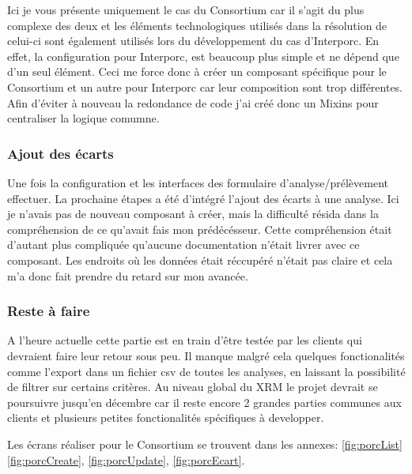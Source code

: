Ici je vous présente uniquement le cas du Consortium car il s'agit du plus complexe des deux et les éléments technologiques utilisés dans la résolution de celui-ci sont également utilisés lors du développement du cas d'Interporc. En effet, la configuration pour Interporc, est beaucoup plus simple et ne dépend que d'un seul élément. Ceci me force donc à créer un composant spécifique pour le Consortium et un autre pour Interporc car leur composition sont trop différentes. Afin d'éviter à nouveau la redondance de code j'ai créé donc un Mixins pour centraliser la logique comumne. 

\subsubsection{Ajout des écarts}
Une fois la configuration et les interfaces des formulaire d'analyse/prélèvement effectuer.
La prochaine étapes a été d'intégré l'ajout des écarts à une analyse. Ici je n'avais pas de nouveau composant à créer, mais la difficulté résida dans la compréhension de ce qu'avait fais mon prédécésseur. Cette compréhension était d'autant plus compliquée qu'aucune documentation n'était livrer avec ce composant. Les endroits où les données était réccupéré n'était pas claire et cela m'a donc fait prendre du retard sur mon avancée. 

\subsubsection{Reste à faire}
A l'heure actuelle cette partie est en train d'être testée par les clients qui devraient faire leur retour sous peu. Il manque malgré cela quelques fonctionalités comme l'export dans un fichier csv de toutes les analyses, en laissant la possibilité de filtrer sur certains critères. Au niveau global du XRM le projet devrait se poursuivre jusqu'en décembre car il reste encore 2 grandes parties communes aux clients et plusieurs petites fonctionalités spécifiques à developper.  

Les écrans réaliser pour le Consortium se trouvent dans les annexes:  \ref{fig:porcList} \ref{fig:porcCreate}, \ref{fig:porcUpdate}, \ref{fig:porcEcart}.